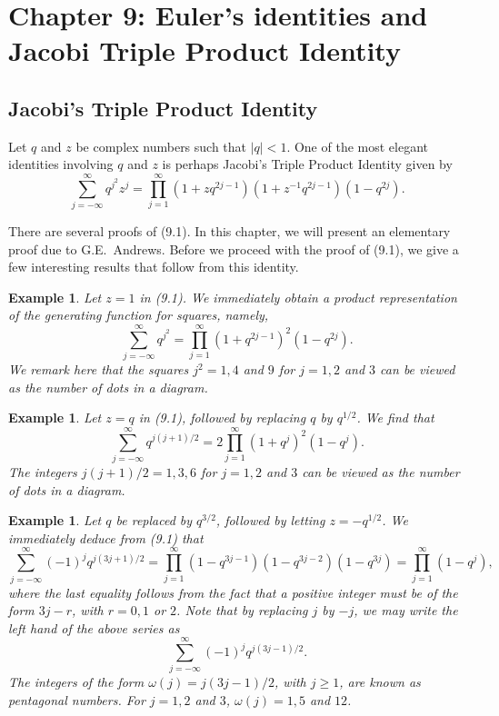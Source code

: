 \documentclass{article}
\newtheorem{example}[theorem]{Example}
\begin{document}
\section*{Chapter 9: Euler's identities and Jacobi Triple Product Identity}

\subsection{Jacobi's Triple Product Identity}

Let $q$ and $z$ be complex numbers such that $|q| < 1$. One of the most elegant
identities involving $q$ and $z$ is perhaps Jacobi's Triple Product Identity given by
\begin{equation}
\sum_{j=-\infty}^{\infty} q^{j^2} z^j = \prod_{j=1}^{\infty} (1 + zq^{2j-1})(1 + z^{-1}q^{2j-1})(1 - q^{2j}).
\tag{9.1}
\end{equation}

There are several proofs of (9.1). In this chapter, we will present an elementary
proof due to G.E.\ Andrews. Before we proceed with the proof of (9.1), we give
a few interesting results that follow from this identity.

\begin{example}
Let $z = 1$ in (9.1). We immediately obtain a product representation
of the generating function for squares, namely,
\[
\sum_{j=-\infty}^{\infty} q^{j^2} = \prod_{j=1}^{\infty} (1 + q^{2j-1})^2(1 - q^{2j}).
\]
We remark here that the squares $j^2 = 1, 4$ and $9$ for $j = 1, 2$ and $3$ can be viewed
as the number of dots in a diagram.
\end{example}

\begin{example}
Let $z = q$ in (9.1), followed by replacing $q$ by $q^{1/2}$. We find that
\[
\sum_{j=-\infty}^{\infty} q^{j(j+1)/2} = 2\prod_{j=1}^{\infty} (1 + q^j)^2(1 - q^j).
\]
The integers $j(j+1)/2 = 1, 3, 6$ for $j = 1, 2$ and $3$ can be viewed as the number
of dots in a diagram.
\end{example}

\begin{example}
Let $q$ be replaced by $q^{3/2}$, followed by letting $z = -q^{1/2}$. We
immediately deduce from (9.1) that
\begin{equation}
\sum_{j=-\infty}^{\infty} (-1)^j q^{j(3j+1)/2} = \prod_{j=1}^{\infty} (1 - q^{3j-1})(1 - q^{3j-2})(1 - q^{3j}) = \prod_{j=1}^{\infty} (1 - q^j),
\tag{9.2}
\end{equation}
where the last equality follows from the fact that a positive integer must be of the
form $3j - r$, with $r = 0, 1$ or $2$. Note that by replacing $j$ by $-j$, we may write
the left hand of the above series as
\[
\sum_{j=-\infty}^{\infty} (-1)^j q^{j(3j-1)/2}.
\]
The integers of the form $\omega(j) = j(3j-1)/2$, with $j \geq 1$, are known as pentagonal
numbers. For $j = 1, 2$ and $3$, $\omega(j) = 1, 5$ and $12$.
\end{example}
\end{document}
